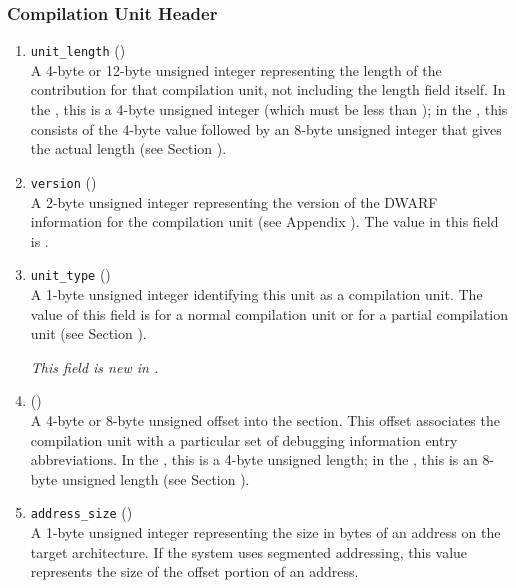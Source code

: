 \subsubsection{Compilation Unit Header}
\label{datarep:compilationunitheader}
\begin{enumerate}[1. ]

\item \texttt{unit\_length} () \\
A 4-byte or 12-byte 
unsigned integer representing the length
of the \dotdebuginfo{}
contribution for that compilation unit,
not including the length field itself. In the \thirtytwobitdwarfformat,
 this is a 4-byte unsigned integer (which must be less
than \xfffffffzero); in the \sixtyfourbitdwarfformat, this consists
of the 4-byte value \wffffffff followed by an 8-byte unsigned
integer that gives the actual length 
(see Section ).

\item  \texttt{version} (\HFTuhalf) \\
A 2-byte unsigned integer representing the version of the
DWARF information for the compilation unit  
(see Appendix ). 
The value in this field is \versiondotdebuginfo.

\item \texttt{unit\_type} (\HFTubyte) \\
A 1-byte unsigned integer identifying this unit as a compilation unit.
The value of this field is 
\DWUTcompile{} for a {normal compilation} unit or
\DWUTpartial{} for a {partial compilation} unit
(see Section ).

\textit{This field is new in \DWARFVersionV.}

\item \HFNdebugabbrevoffset{} () \\
A 
4-byte or 8-byte unsigned offset into the 
\dotdebugabbrev{}
section. This offset associates the compilation unit with a
particular set of debugging information entry abbreviations. In
the \thirtytwobitdwarfformat, this is a 4-byte unsigned length;
in the \sixtyfourbitdwarfformat, this is an 8-byte unsigned length
(see Section ).

\item \texttt{address\_size} (\HFTubyte) \\
A 1-byte unsigned integer representing the size in bytes of
an address on the target architecture. If the system uses
segmented addressing, this value represents the size of the
offset portion of an address.

\end{enumerate}


